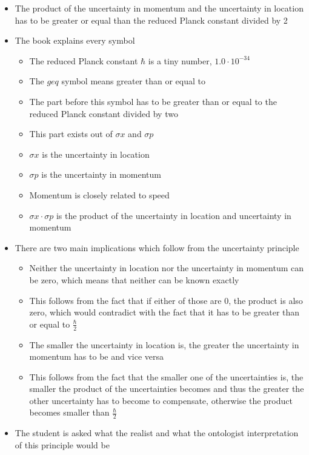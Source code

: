 \documentclass[11pt,twoside]{report} %
\begin{document}
\begin{itemize}
\begin{itemize}
		\item The product of the uncertainty in momentum and the uncertainty in location has to be greater or equal than the reduced Planck constant divided by 2
		\item The book explains every symbol
		\begin{itemize}
			\item The reduced Planck constant $\hbar$ is a tiny number, $1.0 \cdot 10^{-34}$
			\item The $geq$ symbol means greater than or equal to
			\item The part before this symbol has to be greater than or equal to the reduced Planck constant divided by two
			\item This part exists out of $\sigma x$ and $\sigma p$
			\item $\sigma x$ is the uncertainty in location
			\item $\sigma p$ is the uncertainty in momentum
			\item Momentum is closely related to speed
			\item $\sigma x \cdot \sigma p$ is the product of the uncertainty in location and uncertainty in momentum
		\end{itemize}
		\item There are two main implications which follow from the uncertainty principle
		\begin{itemize}
			\item Neither the uncertainty in location nor the uncertainty in momentum can be zero, which means that neither can be known exactly
			\item This follows from the fact that if either of those are 0, the product is also zero, which would contradict with the fact that it has to be greater than or equal to $\frac{\hbar}{2}$
			\item The smaller the uncertainty in location is, the greater the uncertainty in momentum has to be and vice versa
			\item This follows from the fact that the smaller one of the uncertainties is, the smaller the product of the uncertainties becomes and thus the greater the other uncertainty has to become to compensate, otherwise the product becomes smaller than $\frac{\hbar}{2}$
		\end{itemize}
		\item The student is asked what the realist and what the ontologist interpretation of this principle would be
		\begin{itemize}

\end{itemize}
\end{itemize}
\end{itemize}
\end{document}

